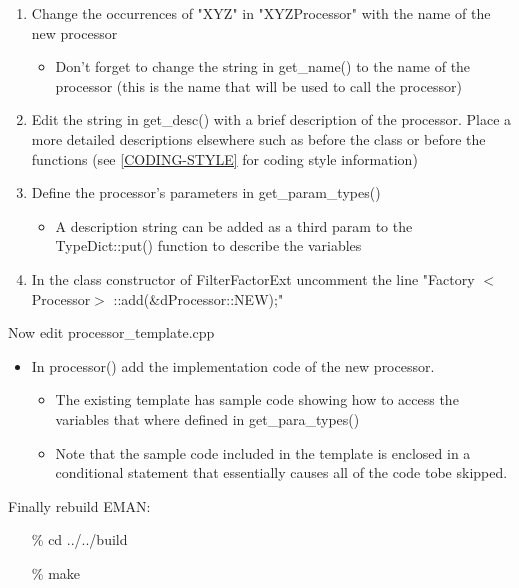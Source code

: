       \begin{enumerate}
	\item
	  Change the occurrences of "XYZ" in "XYZProcessor" with the name of
	  the new processor
	  \begin{itemize}
	    \item
	      Don't forget to change the string in get\_name() to the name of
	      the processor (this is the name that will be used to
	      call the processor)
	  \end{itemize}
	\item
	  Edit the string in get\_desc() with a brief description of the
	  processor.  Place a more detailed descriptions elsewhere such as
          before the class or before the functions (see
	  \ref{CODING-STYLE} for coding style information)
	\item
	  Define the processor's parameters in get\_param\_types()
	  \begin{itemize}
	    \item
	      A description string can be added as a third param to the
	      TypeDict::put() function to describe the variables 
	  \end{itemize}
	\item
	  In the class constructor of FilterFactorExt uncomment the line
	  "Factory $<$Processor$>$ ::add(\&dProcessor::NEW);"
      \end{enumerate}

      Now edit processor\_template.cpp
      
      \begin{itemize}
	\item
	  In processor() add the implementation code of the new
	  processor.
	  \begin{itemize}
	    \item
	      The existing template has sample code showing how to access the
	      variables that where defined in get\_para\_types()
	    \item
	      Note that the sample code included in the template is enclosed in
	      a conditional statement that essentially causes all of
	      the code tobe skipped.
	  \end{itemize}
      \end{itemize}

      Finally rebuild EMAN:
      \begin{itemize}
	\item[\%] cd ../../build
	\item[\%] make
      \end{itemize}

